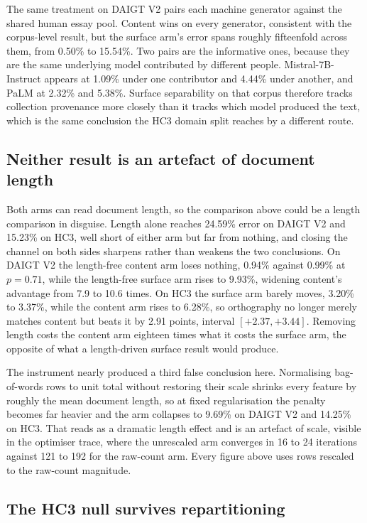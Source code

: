 The same treatment on DAIGT V2 pairs each machine generator against the shared human essay pool. Content wins on every generator, consistent with the corpus-level result, but the surface arm's error spans roughly fifteenfold across them, from 0.50\% to 15.54\%. Two pairs are the informative ones, because they are the same underlying model contributed by different people. Mistral-7B-Instruct appears at 1.09\% under one contributor and 4.44\% under another, and PaLM at 2.32\% and 5.38\%. Surface separability on that corpus therefore tracks collection provenance more closely than it tracks which model produced the text, which is the same conclusion the HC3 domain split reaches by a different route.

\subsection{Neither result is an artefact of document length}
\label{sec:length}

Both arms can read document length, so the comparison above could be a length comparison in disguise. Length alone reaches 24.59\% error on DAIGT V2 and 15.23\% on HC3, well short of either arm but far from nothing, and closing the channel on both sides sharpens rather than weakens the two conclusions. On DAIGT V2 the length-free content arm loses nothing, 0.94\% against 0.99\% at $p=0.71$, while the length-free surface arm rises to 9.93\%, widening content's advantage from 7.9 to 10.6 times. On HC3 the surface arm barely moves, 3.20\% to 3.37\%, while the content arm rises to 6.28\%, so orthography no longer merely matches content but beats it by 2.91 points, interval $[+2.37, +3.44]$. Removing length costs the content arm eighteen times what it costs the surface arm, the opposite of what a length-driven surface result would produce.

The instrument nearly produced a third false conclusion here. Normalising bag-of-words rows to unit total without restoring their scale shrinks every feature by roughly the mean document length, so at fixed regularisation the penalty becomes far heavier and the arm collapses to 9.69\% on DAIGT V2 and 14.25\% on HC3. That reads as a dramatic length effect and is an artefact of scale, visible in the optimiser trace, where the unrescaled arm converges in 16 to 24 iterations against 121 to 192 for the raw-count arm. Every figure above uses rows rescaled to the raw-count magnitude.

\FloatBarrier
\subsection{The HC3 null survives repartitioning}
\label{sec:multisplit}

